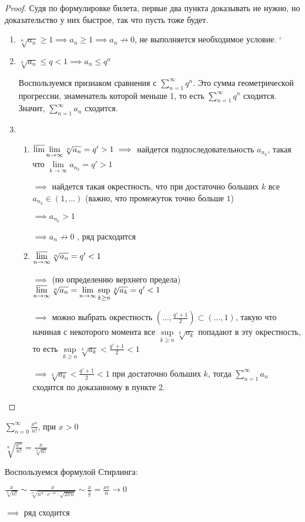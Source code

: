 \begin{proof}\thmslashn
	
	Судя по формулировке билета, первые два пункта доказывать не нужно, но доказательство у них быстрое, так что пусть тоже будет.
	\begin{enumerate}
		\item $\sqrt[n]{a_n} \ge 1 \implies a_n \ge 1 \implies a_n \not\to 0$, не выполняется необходимое условие.
		`
		\item $\sqrt[n]{a_n} \le q < 1 \implies a_n \le q^n$

		Воспользуемся признаком сравнения с $\sum\limits_{n=1}^{\infty}q^n$. Это сумма геометрической прогрессии, знаменатель которой меньше 1, то есть $\sum\limits_{n=1}^{\infty}q^n$ сходится. Значит, $\sum\limits_{n=1}^{\infty}a_n$ сходится.
		
		
		\item 
		\begin{enumerate}
			\item $\varlimsup\lim\limits_{n \to \infty} \sqrt[n]{a_n} = q' > 1 \implies $ найдется подпоследовательность  $a_{n_k}$, такая что $\lim\limits_{k \to \infty} a_{n_k} = q' > 1$

			$\implies$ найдется такая окрестность, что при достаточно больших $k$ все $a_{n_k} \in (1, \dots)$ (важно, что промежуток точно больше $1$) 

			$\implies a_{n_k} > 1$

			$\implies a_n \not\to 0$ , ряд расходится


			\item $\varlimsup\limits_{n \to \infty} \sqrt[n]{a_n} = q'< 1$

			$\implies$ (по определению верхнего предела) $\varlimsup\limits_{n \to \infty} \sqrt[n]{a_n} = \lim\limits_{n \to \infty} \sup\limits_{k \ge n} \sqrt[k]{a_k} = q' < 1$
		

			$\implies$ можно выбрать окрестность $(\dots, \frac{q' + 1}{2}) \subset (\dots, 1)$, такую что начиная с некоторого момента все $\sup\limits_{k \ge n} \sqrt[k]{a_k}$ попадают в эту окрестность, то есть $\sup\limits_{k \ge n} \sqrt[k]{a_k} < \frac{q' + 1}{2} < 1$

			$\implies \sqrt[k]{a_k} < \frac{q' + 1}{2} < 1$ при достаточно больших $k$, тогда $\sum\limits_{n=1}^{\infty}a_n$ сходится по доказанному в пункте 2.

	\end{enumerate}
	\end{enumerate}
\end{proof}
\begin{example}\thmslashn
	
	$\sum\limits_{n = 0}^{\infty} \frac{x^n}{n!}$, при $x > 0$
	
		
	$\sqrt[n]{\frac{x^n}{n!}} = \frac{x}{\sqrt[n]{n!}}$ 

	Воспользуемся формулой Стирлинга:

	$ \frac{x}{\sqrt[n]{n!}} \sim \frac{x}{\sqrt[n]{n^n\cdot e^{-n} \cdot \sqrt{2\pi n}}}\sim \frac x {\frac ne} = \frac{xe}{n} \to 0$

	$\implies $ ряд сходится
\end{example}


